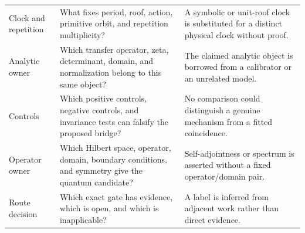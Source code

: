 \begin{longtable}[]{@{}lll@{}}
\begin{minipage}[t]{0.30\columnwidth}
Clock and repetition\strut
\end{minipage} & \begin{minipage}[t]{0.30\columnwidth}\raggedright
What fixes period, roof, action, primitive orbit, and repetition multiplicity?\strut
\end{minipage} & \begin{minipage}[t]{0.30\columnwidth}\raggedright
A symbolic or unit-roof clock is substituted for a distinct physical clock without proof.\strut
\end{minipage}\tabularnewline
\begin{minipage}[t]{0.30\columnwidth}\raggedright
Analytic owner\strut
\end{minipage} & \begin{minipage}[t]{0.30\columnwidth}\raggedright
Which transfer operator, zeta, determinant, domain, and normalization belong to this same object?\strut
\end{minipage} & \begin{minipage}[t]{0.30\columnwidth}\raggedright
The claimed analytic object is borrowed from a calibrator or an unrelated model.\strut
\end{minipage}\tabularnewline
\begin{minipage}[t]{0.30\columnwidth}\raggedright
Controls\strut
\end{minipage} & \begin{minipage}[t]{0.30\columnwidth}\raggedright
Which positive controls, negative controls, and invariance tests can falsify the proposed bridge?\strut
\end{minipage} & \begin{minipage}[t]{0.30\columnwidth}\raggedright
No comparison could distinguish a genuine mechanism from a fitted coincidence.\strut
\end{minipage}\tabularnewline
\begin{minipage}[t]{0.30\columnwidth}\raggedright
Operator owner\strut
\end{minipage} & \begin{minipage}[t]{0.30\columnwidth}\raggedright
Which Hilbert space, operator, domain, boundary conditions, and symmetry give the quantum candidate?\strut
\end{minipage} & \begin{minipage}[t]{0.30\columnwidth}\raggedright
Self-adjointness or spectrum is asserted without a fixed operator/domain pair.\strut
\end{minipage}\tabularnewline
\begin{minipage}[t]{0.30\columnwidth}\raggedright
Route decision\strut
\end{minipage} & \begin{minipage}[t]{0.30\columnwidth}\raggedright
Which exact gate has evidence, which is open, and which is inapplicable?\strut
\end{minipage} & \begin{minipage}[t]{0.30\columnwidth}\raggedright
A label is inferred from adjacent work rather than direct evidence.\strut
\end{minipage}\tabularnewline
\bottomrule
\end{longtable}

